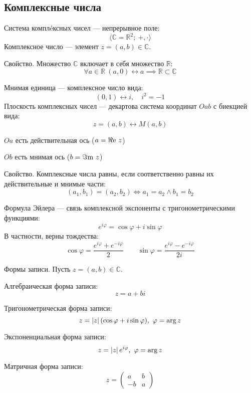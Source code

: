 \newpage
\subsection{Комплексные числа}

{\bold Система комплéксных чисел} --- непрерывное поле:
$$\langle\mathbb{C}=\mathbb{R}^2;\ +,\cdot\rangle$$
{\bold Комплексное число} --- элемент $z=(a,b)\in\mathbb{C}$.
\begin{theorem}
{\bold Свойство.} Множество $\mathbb{C}$ включает в себя множество $\mathbb{R}$:
$$\forall a\in\mathbb{R}\ (a,0)\leftrightarrow a\implies\mathbb{R}\subset\mathbb{C}$$
\end{theorem}
{\bold Мнимая единица} --- комплексное число вида:
$$(0,1)\leftrightarrow i,\quad i^2=-1$$
{\bold Плоскость комплексных чисел} --- декартова система координат $Oab$ с биекцией вида:
$$z=(a,b)\leftrightarrow M(a,b)$$

\begin{list*}
\item $Oa$ есть действительная ось {\ital\color{desc}($a=\Re\text{e}\ z$)}
\item $Ob$ есть мнимая ось {\ital\color{desc}($b=\Im\text{m}\ z$)}
\end{list*}
\begin{theorem}
{\bold Свойство.} Комплексные числа {\ital равны}, если соответственно равны их действительные и мнимые части:
$$(a_1,b_1)=(a_2,b_2)\iff a_1=a_2\land b_1=b_2$$
\end{theorem}

{\bold Формула Эйлера} --- связь комплексной экспоненты с тригонометрическими функциями:
$$e^{i\varphi}=\cos\varphi+i\sin\varphi$$
В частности, верны тождества:
$$\cos\varphi=\frac{e^{i\varphi}+e^{-i\varphi}}{2}\qquad\sin\varphi=\frac{e^{i\varphi}-e^{-i\varphi}}{2i}$$
\begin{theorem}
{\bold Формы записи.} Пусть $z=(a,b)\in\mathbb{C}$.
\begin{list*}[][\#]
\item Алгебраическая форма записи:
$$z=a+bi$$
\item Тригонометрическая форма записи:
$$z=\abs{z}(\cos\varphi+i\sin\varphi),\ \varphi=\arg z$$
\item Экспоненциальная форма записи:
$$z=\left|z\right|e^{i\varphi},\ \varphi=\arg z$$
\item Матричная форма записи:
$$z=\begin{pmatrix}
a & b\\
-b & a
\end{pmatrix}$$
\end{list*}
\end{theorem}

